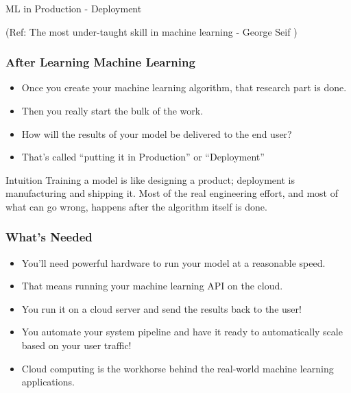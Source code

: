 \begin{frame}[fragile]\frametitle{}
\begin{center}
{\Large ML in Production - Deployment}


{\tiny (Ref: The most under-taught skill in machine learning - George Seif )}
\end{center}


\end{frame}

\begin{frame}\frametitle{After Learning Machine Learning}

\begin{itemize}
\item Once you create your machine learning algorithm, that research part is done.
\item Then you really start the bulk of the work.
\item How will the results of your model be delivered to the end user?
\item That's called ``putting it in Production'' or ``Deployment''
\end{itemize}

\begin{block}{Intuition}
Training a model is like designing a product; deployment is manufacturing and shipping it.
Most of the real engineering effort, and most of what can go wrong, happens after the
algorithm itself is done.
\end{block}
\end{frame}

\begin{frame}\frametitle{What's Needed}

\begin{itemize}
\item You'll need powerful hardware to run your model at a reasonable speed.
\item That means running your machine learning API on the cloud.
\item You run it on a cloud server and send the results back to the user!
\item You automate your system pipeline and have it ready to automatically scale based on your user traffic!
\item Cloud computing is the workhorse behind the real-world machine learning applications.
\end{itemize}
\end{frame}

